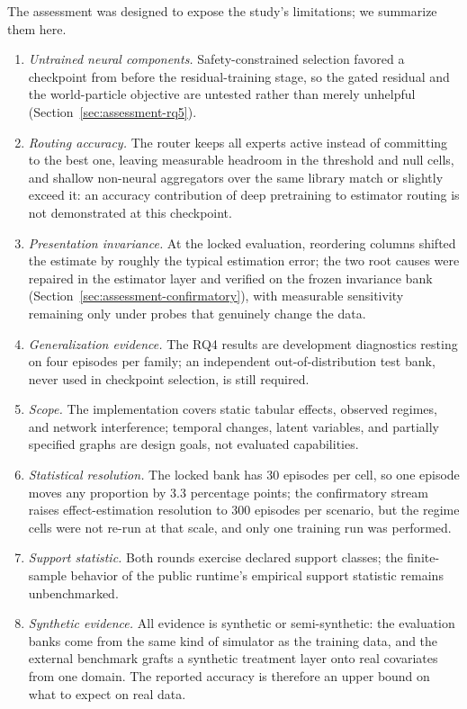 \documentclass[electronics,article,submit,oneauthor]{Definitions/mdpi}
\begin{document}
The assessment was designed to expose the study's limitations; we summarize them here.
\begin{enumerate}
\item \emph{Untrained neural components.} Safety-constrained selection favored a checkpoint from before the residual-training stage, so the gated residual and the world-particle objective are untested rather than merely unhelpful (Section~\ref{sec:assessment-rq5}).
\item \emph{Routing accuracy.} The router keeps all experts active instead of committing to the best one, leaving measurable headroom in the threshold and null cells, and shallow non-neural aggregators over the same library match or slightly exceed it: an accuracy contribution of deep pretraining to estimator routing is not demonstrated at this checkpoint.
\item \emph{Presentation invariance.} At the locked evaluation, reordering columns shifted the estimate by roughly the typical estimation error; the two root causes were repaired in the estimator layer and verified on the frozen invariance bank (Section~\ref{sec:assessment-confirmatory}), with measurable sensitivity remaining only under probes that genuinely change the data.
\item \emph{Generalization evidence.} The RQ4 results are development diagnostics resting on four episodes per family; an independent out-of-distribution test bank, never used in checkpoint selection, is still required.
\item \emph{Scope.} The implementation covers static tabular effects, observed regimes, and network interference; temporal changes, latent variables, and partially specified graphs are design goals, not evaluated capabilities.
\item \emph{Statistical resolution.} The locked bank has 30 episodes per cell, so one episode moves any proportion by 3.3 percentage points; the confirmatory stream raises effect-estimation resolution to 300 episodes per scenario, but the regime cells were not re-run at that scale, and only one training run was performed.
\item \emph{Support statistic.} Both rounds exercise declared support classes; the finite-sample behavior of the public runtime's empirical support statistic remains unbenchmarked.
\item \emph{Synthetic evidence.} All evidence is synthetic or semi-synthetic: the evaluation banks come from the same kind of simulator as the training data, and the external benchmark grafts a synthetic treatment layer onto real covariates from one domain. The reported accuracy is therefore an upper bound on what to expect on real data.
\end{enumerate}
\end{document}
